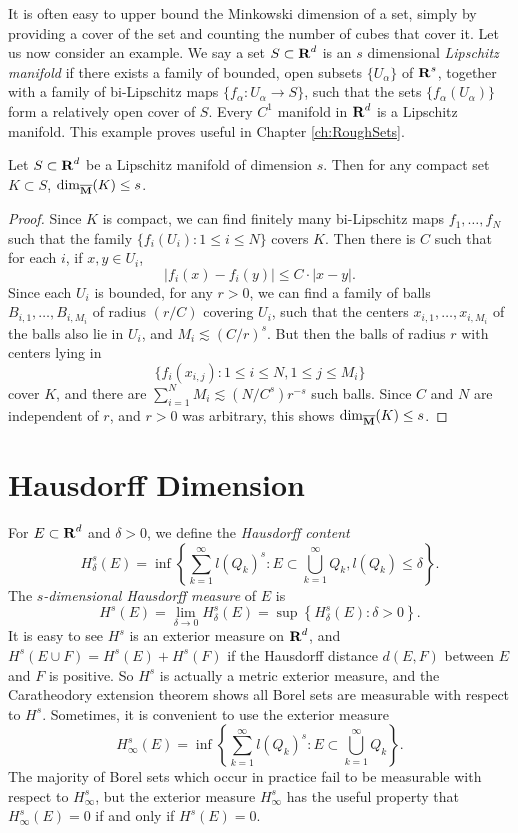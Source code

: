 It is often easy to upper bound the Minkowski dimension of a set, simply by providing a cover of the set and counting the number of cubes that cover it. Let us now consider an example. We say a set $S \subset \operatorname{\mathbf{R}}^d$ is an $s$ dimensional \emph{Lipschitz manifold} if there exists a family of bounded, open subsets $\{ U_\alpha \}$ of $\operatorname{\mathbf{R}}^s$, together with a family of bi-Lipschitz maps $\{ f_\alpha: U_\alpha \to S \}$, such that the sets $\{ f_\alpha(U_\alpha) \}$ form a relatively open cover of $S$. Every $C^1$ manifold in $\operatorname{\mathbf{R}}^d$ is a Lipschitz manifold. This example proves useful in Chapter \ref{ch:RoughSets}.

\begin{theorem} \label{ManifoldDimensionThm}
	Let $S \subset \operatorname{\mathbf{R}}^d$ be a Lipschitz manifold of dimension $s$. Then for any compact set $K \subset S$, $\operatorname{\dim_{\overline{\mathbf{M}}}}(K) \leq s$.
\end{theorem}
\begin{proof}
	Since $K$ is compact, we can find finitely many bi-Lipschitz maps $f_1, \dots, f_N$ such that the family $\{ f_i(U_i) : 1 \leq i \leq N \}$ covers $K$. Then there is $C$ such that for each $i$, if $x,y \in U_i$,
	\[ |f_i(x) - f_i(y)| \leq C \cdot |x-y|. \]
	Since each $U_i$ is bounded, for any $r > 0$, we can find a family of balls $B_{i,1}, \dots, B_{i,M_i}$ of radius $(r/C)$ covering $U_i$, such that the centers $x_{i,1}, \dots, x_{i,M_i}$ of the balls also lie in $U_i$, and $M_i \lesssim (C/r)^s$. But then the balls of radius $r$ with centers lying in
	\[ \{ f_i(x_{i,j}) : 1 \leq i \leq N, 1 \leq j \leq M_i \} \]
	cover $K$, and there are $\sum_{i = 1}^N M_i \lesssim (N/C^s) r^{-s}$ such balls. Since $C$ and $N$ are independent of $r$, and $r > 0$ was arbitrary, this shows $\operatorname{\dim_{\overline{\mathbf{M}}}}(K) \leq s$.
\end{proof}

\section{Hausdorff Dimension}

For $E \subset \operatorname{\mathbf{R}}^d$ and $\delta > 0$, we define the \emph{Hausdorff content}
%
\[ H_\delta^s(E) = \inf \left\{ \sum_{k = 1}^\infty l(Q_k)^s : E \subset \bigcup_{k = 1}^\infty Q_k, l(Q_k) \leq \delta \right\}. \]
%
The \emph{$s$-dimensional Hausdorff measure} of $E$ is
%
\[ H^s(E) = \lim_{\delta \to 0} H_\delta^s(E) = \sup \left\{ H^s_\delta(E) : \delta > 0 \right\}. \]
%
It is easy to see $H^s$ is an exterior measure on $\operatorname{\mathbf{R}}^d$, and $H^s(E \cup F) = H^s(E) + H^s(F)$ if the Hausdorff distance $d(E,F)$ between $E$ and $F$ is positive. So $H^s$ is actually a metric exterior measure, and the Caratheodory extension theorem shows all Borel sets are measurable with respect to $H^s$. Sometimes, it is convenient to use the exterior measure
%
\[ H^s_\infty(E) = \inf \left\{ \sum_{k = 1}^\infty l(Q_k)^s : E \subset \bigcup_{k = 1}^\infty Q_k \right\}. \]
%
The majority of Borel sets which occur in practice fail to be measurable with respect to $H^s_\infty$, but the exterior measure $H^s_\infty$ has the useful property that $H^s_\infty(E) = 0$ if and only if $H^s(E) = 0$.

